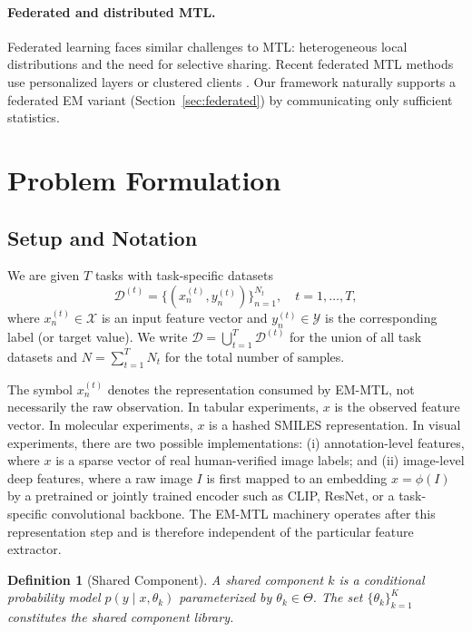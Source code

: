 \documentclass[preprint,12pt]{elsarticle}
\newtheorem{definition}{Definition}
\begin{document}
	\paragraph{Federated and distributed MTL.}
	Federated learning \citep{mcmahan2017communication} faces similar
	challenges to MTL: heterogeneous local distributions and the need for
	selective sharing. Recent federated MTL methods use personalized layers
	or clustered clients \citep{smith2017federated}. Our framework
	naturally supports a federated EM variant (Section~\ref{sec:federated})
	by communicating only sufficient statistics.
	
	\section{Problem Formulation}
	\label{sec:formulation}
	
	\subsection{Setup and Notation}
	
	We are given $T$ tasks with task-specific datasets
	\[
	\mathcal{D}^{(t)} = \bigl\{(x_n^{(t)}, y_n^{(t)})\bigr\}_{n=1}^{N_t},
	\quad t = 1,\dots,T,
	\]
	where $x_n^{(t)} \in \mathcal{X}$ is an input feature vector and
	$y_n^{(t)} \in \mathcal{Y}$ is the corresponding label (or target
	value). We write $\mathcal{D} = \bigcup_{t=1}^T \mathcal{D}^{(t)}$
	for the union of all task datasets and $N = \sum_{t=1}^T N_t$ for
	the total number of samples.

	The symbol $x_n^{(t)}$ denotes the representation consumed by EM-MTL,
	not necessarily the raw observation. In tabular experiments, $x$ is the
	observed feature vector. In molecular experiments, $x$ is a hashed
	SMILES representation. In visual experiments, there are two possible
	implementations: (i) annotation-level features, where $x$ is a sparse
	vector of real human-verified image labels; and (ii) image-level deep
	features, where a raw image $I$ is first mapped to an embedding
	$x=\phi(I)$ by a pretrained or jointly trained encoder such as CLIP,
	ResNet, or a task-specific convolutional backbone. The EM-MTL machinery
	operates after this representation step and is therefore independent of
	the particular feature extractor.
	
	\begin{definition}[Shared Component]
		A \emph{shared component} $k$ is a conditional probability model
		$p(y \mid x, \theta_k)$ parameterized by $\theta_k \in \Theta$.
		The set $\{\theta_k\}_{k=1}^K$ constitutes the \emph{shared
			component library}.
	\end{definition}
	
\end{document}
